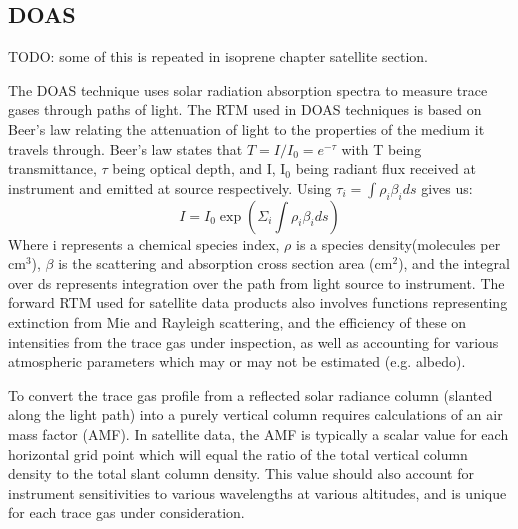   \subsection{DOAS}
    TODO: some of this is repeated in isoprene chapter satellite section.
    
    The DOAS technique uses solar radiation absorption spectra to measure trace gases through paths of light.
    The RTM used in DOAS techniques is based on Beer's law relating the attenuation of light to the properties of the medium it travels through.
    Beer's law states that $ T = I/I_0 = e^{-\tau} $ with T being transmittance, $\tau$ being optical depth, and I, I$_0$ being radiant flux received at instrument and emitted at source respectively.
    Using 
    $ \tau_i = \int \rho_i \beta_i ds $ gives us:
    $$ I = I_0 \exp {\left( \Sigma_i \int \rho_i \beta_i ds \right) } $$
    Where i represents a chemical species index, $\rho$ is a species density(molecules per cm$^3$), $\beta$ is the scattering and absorption cross section area (cm$^2$), and the integral over ds represents integration over the path from light source to instrument.
    The forward RTM used for satellite data products also involves functions representing extinction from Mie and Rayleigh scattering, and the efficiency of these on intensities from the trace gas under inspection, as well as accounting for various atmospheric parameters which may or may not be estimated (e.g. albedo).
    
    To convert the trace gas profile from a reflected solar radiance column (slanted along the light path) into a purely vertical column requires calculations of an air mass factor (AMF).
    In satellite data, the AMF is typically a scalar value for each horizontal grid point which will equal the ratio of the total vertical column density to the total slant column density. This value should also account for instrument sensitivities to various wavelengths at various altitudes, and is unique for each trace gas under consideration.
  
